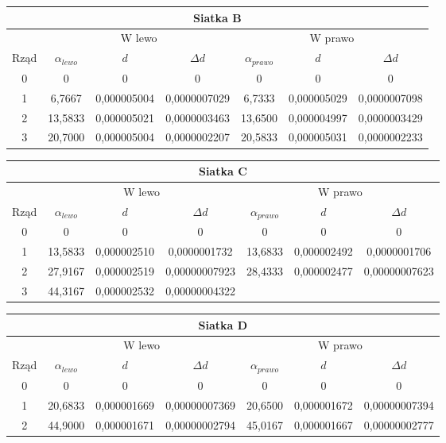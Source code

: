 \documentclass[10pt,a4paper]{article}
\begin{document}
\begin{center}
\begin{tabular}{|c|c|c|c|c|c|c|}
\hline
\multicolumn{7}{|c|}{Siatka B}\\
\hline
& \multicolumn{3}{c}{W lewo} & \multicolumn{3}{|c|}{W prawo}\\
\hline
Rząd & $\alpha_{lewo}$ & $d$ &$\Delta d$ &$\alpha_{prawo}$&$d$&$\Delta d$\\
\hline
0&0&0&0&0&0&0\\ 
\hline
1&6,7667 &0,000005004&0,0000007029&6,7333&0,000005029&0,0000007098\\ 
\hline 
2&13,5833&0,000005021&0,0000003463&13,6500&0,000004997&0,0000003429\\ 
\hline 
3&20,7000&0,000005004&0,0000002207&20,5833&0,000005031&0,0000002233\\ 
\hline 
 
\end{tabular}
\end{center}

\begin{center}
\begin{tabular}{|c|c|c|c|c|c|c|}
\hline
\multicolumn{7}{|c|}{Siatka C}\\
\hline
& \multicolumn{3}{c}{W lewo} & \multicolumn{3}{|c|}{W prawo}\\
\hline
Rząd & $\alpha_{lewo}$ & $d$ &$\Delta d$ &$\alpha_{prawo}$&$d$&$\Delta d$\\
\hline
0&0&0&0&0&0&0\\ 
\hline
1 &13,5833 &0,000002510 & 0,0000001732 & 13,6833 & 0,000002492 & 0,0000001706\\ 
\hline 
2 &27,9167 &0,000002519 & 0,00000007923 & 28,4333 & 0,000002477 & 0,00000007623\\ 
\hline 
3 &44,3167 &0,000002532 & 0,00000004322 & & &\\ 
\hline 

 
\end{tabular}
\end{center}

\begin{center}
\begin{tabular}{|c|c|c|c|c|c|c|}
\hline
\multicolumn{7}{|c|}{Siatka D}\\
\hline
& \multicolumn{3}{c}{W lewo} & \multicolumn{3}{|c|}{W prawo}\\
\hline
Rząd & $\alpha_{lewo}$ & $d$ &$\Delta d$ &$\alpha_{prawo}$&$d$&$\Delta d$\\
\hline
0&0&0&0&0&0&0\\ 
\hline
1&20,6833&0,000001669& 0,00000007369 & 20,6500& 0,000001672 &0,00000007394\\ 
\hline 
2&44,9000&0,000001671& 0,00000002794 & 45,0167& 0,000001667 &0,00000002777\\ 
\hline 
 
\end{tabular}
\end{center}
\end{document}
